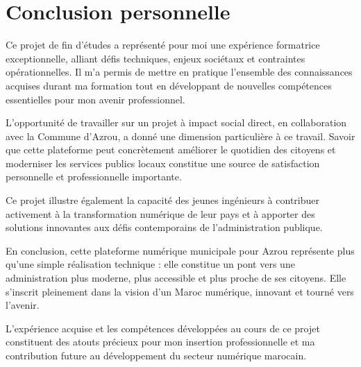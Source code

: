 \section*{Conclusion personnelle}

Ce projet de fin d'études a représenté pour moi une expérience formatrice exceptionnelle, alliant défis techniques, enjeux sociétaux et contraintes opérationnelles. Il m'a permis de mettre en pratique l'ensemble des connaissances acquises durant ma formation tout en développant de nouvelles compétences essentielles pour mon avenir professionnel.

L'opportunité de travailler sur un projet à impact social direct, en collaboration avec la Commune d'Azrou, a donné une dimension particulière à ce travail. Savoir que cette plateforme peut concrètement améliorer le quotidien des citoyens et moderniser les services publics locaux constitue une source de satisfaction personnelle et professionnelle importante.

Ce projet illustre également la capacité des jeunes ingénieurs à contribuer activement à la transformation numérique de leur pays et à apporter des solutions innovantes aux défis contemporains de l'administration publique.

En conclusion, cette plateforme numérique municipale pour Azrou représente plus qu'une simple réalisation technique : elle constitue un pont vers une administration plus moderne, plus accessible et plus proche de ses citoyens. Elle s'inscrit pleinement dans la vision d'un Maroc numérique, innovant et tourné vers l'avenir.

L'expérience acquise et les compétences développées au cours de ce projet constituent des atouts précieux pour mon insertion professionnelle et ma contribution future au développement du secteur numérique marocain.

